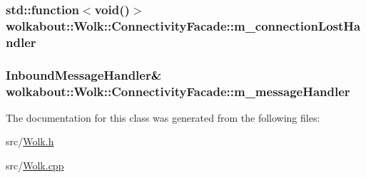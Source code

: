 \subsubsection[{\texorpdfstring{m\+\_\+connection\+Lost\+Handler}{m_connectionLostHandler}}]{\setlength{\rightskip}{0pt plus 5cm}std\+::function$<$void()$>$ wolkabout\+::\+Wolk\+::\+Connectivity\+Facade\+::m\+\_\+connection\+Lost\+Handler\hspace{0.3cm}{\ttfamily [private]}}\hypertarget{classwolkabout_1_1_wolk_1_1_connectivity_facade_abcb09f790a27656ce879445d147dd090}{}\label{classwolkabout_1_1_wolk_1_1_connectivity_facade_abcb09f790a27656ce879445d147dd090}
\subsubsection[{\texorpdfstring{m\+\_\+message\+Handler}{m_messageHandler}}]{\setlength{\rightskip}{0pt plus 5cm}Inbound\+Message\+Handler\& wolkabout\+::\+Wolk\+::\+Connectivity\+Facade\+::m\+\_\+message\+Handler\hspace{0.3cm}{\ttfamily [private]}}\hypertarget{classwolkabout_1_1_wolk_1_1_connectivity_facade_a3bb32b6dccd5d889b96d4dd957d5466e}{}\label{classwolkabout_1_1_wolk_1_1_connectivity_facade_a3bb32b6dccd5d889b96d4dd957d5466e}


The documentation for this class was generated from the following files\+:\begin{DoxyCompactItemize}
\item 
src/\hyperlink{_wolk_8h}{Wolk.\+h}\item 
src/\hyperlink{_wolk_8cpp}{Wolk.\+cpp}\end{DoxyCompactItemize}
